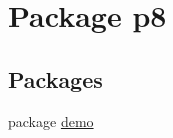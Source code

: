 \hypertarget{namespacep8}{}\section{Package p8}
\label{namespacep8}
\subsection*{Packages}
\begin{DoxyCompactItemize}
\item 
package \hyperlink{namespacep8_1_1demo}{demo}
\end{DoxyCompactItemize}
